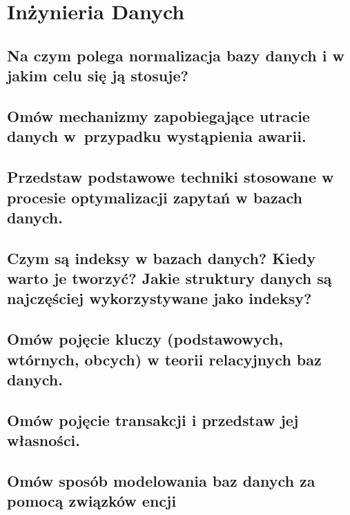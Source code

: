 \chapter{Inżynieria Danych}

\section{Na czym polega normalizacja bazy danych i w jakim celu się ją stosuje?}


\section{Omów mechanizmy zapobiegające utracie danych w~przypadku wystąpienia awarii.}


\section{Przedstaw podstawowe techniki stosowane w procesie optymalizacji zapytań w bazach danych.}


\section{Czym są indeksy w bazach danych? Kiedy warto je tworzyć? Jakie struktury danych są najczęściej wykorzystywane jako indeksy?}


\section{Omów pojęcie kluczy (podstawowych, wtórnych, obcych) w teorii relacyjnych baz danych.}


\section{Omów pojęcie transakcji i przedstaw jej własności.}


\section{Omów sposób modelowania baz danych za pomocą związków encji}
